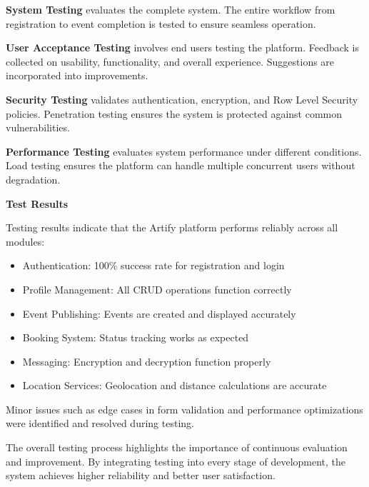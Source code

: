 \documentclass[12pt,a4paper]{report}
\begin{document}
\textbf{System Testing} evaluates the complete system. The entire workflow from registration to event completion is tested to ensure seamless operation.

\textbf{User Acceptance Testing} involves end users testing the platform. Feedback is collected on usability, functionality, and overall experience. Suggestions are incorporated into improvements.

\textbf{Security Testing} validates authentication, encryption, and Row Level Security policies. Penetration testing ensures the system is protected against common vulnerabilities.

\textbf{Performance Testing} evaluates system performance under different conditions. Load testing ensures the platform can handle multiple concurrent users without degradation.

\textbf{Test Results}

Testing results indicate that the Artify platform performs reliably across all modules:

\begin{itemize}
    \item Authentication: 100\% success rate for registration and login
    \item Profile Management: All CRUD operations function correctly
    \item Event Publishing: Events are created and displayed accurately
    \item Booking System: Status tracking works as expected
    \item Messaging: Encryption and decryption function properly
    \item Location Services: Geolocation and distance calculations are accurate
\end{itemize}

Minor issues such as edge cases in form validation and performance optimizations were identified and resolved during testing.

The overall testing process highlights the importance of continuous evaluation and improvement. By integrating testing into every stage of development, the system achieves higher reliability and better user satisfaction.

\setcounter{chapter}{7}
\clearpage
\thispagestyle{empty}

\noindent
{}
\end{document}
